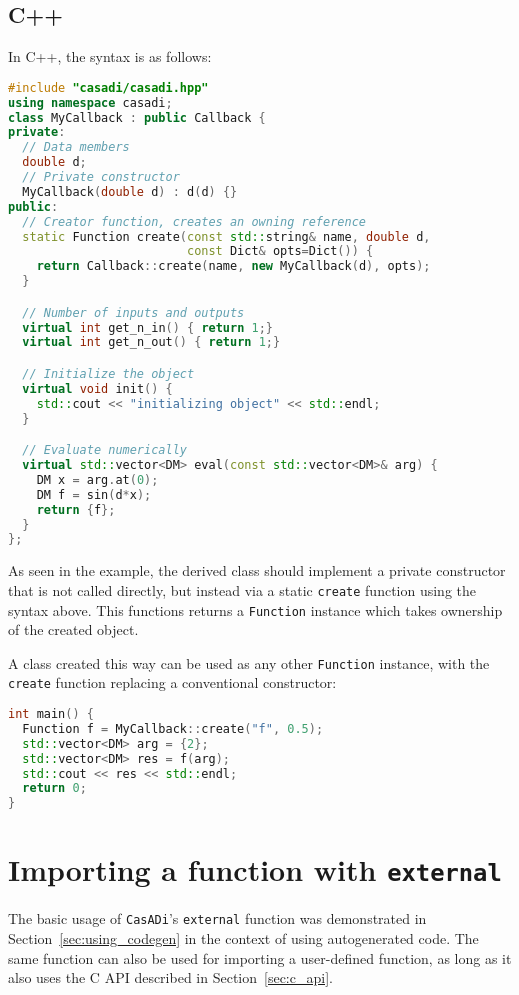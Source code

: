 \documentclass[a4paper,12pt]{book}
\newcommand{\CasADi}{\texttt{CasADi}\xspace}
\begin{document}
\subsection*{C++}
In C++, the syntax is as follows:
\begin{lstlisting}[language=C++]
#include "casadi/casadi.hpp"
using namespace casadi;
class MyCallback : public Callback {
private:
  // Data members
  double d;
  // Private constructor
  MyCallback(double d) : d(d) {}
public:
  // Creator function, creates an owning reference
  static Function create(const std::string& name, double d,
                         const Dict& opts=Dict()) {
    return Callback::create(name, new MyCallback(d), opts);
  }

  // Number of inputs and outputs
  virtual int get_n_in() { return 1;}
  virtual int get_n_out() { return 1;}

  // Initialize the object
  virtual void init() {
    std::cout << "initializing object" << std::endl;
  }

  // Evaluate numerically
  virtual std::vector<DM> eval(const std::vector<DM>& arg) {
    DM x = arg.at(0);
    DM f = sin(d*x);
    return {f};
  }
};
\end{lstlisting}

As seen in the example, the derived class should implement a private
constructor that is not called directly, but instead via a static \texttt{create}
function using the syntax above.
This functions returns a \texttt{Function} instance which takes ownership of the
created object.

A class created this way can be used as any other \texttt{Function} instance,
with the \texttt{create} function replacing a conventional constructor:

\begin{lstlisting}[language=C++]
int main() {
  Function f = MyCallback::create("f", 0.5);
  std::vector<DM> arg = {2};
  std::vector<DM> res = f(arg);
  std::cout << res << std::endl;
  return 0;
}
\end{lstlisting}

\section{Importing a function with \texttt{external}} \label{sec:external}
The basic usage of \CasADi's \texttt{external} function was demonstrated in
Section~\ref{sec:using_codegen} in the context of using autogenerated code. The
same function can also be used for importing a user-defined function, as long as
it also uses the C API described in Section~\ref{sec:c_api}.
\end{document}
